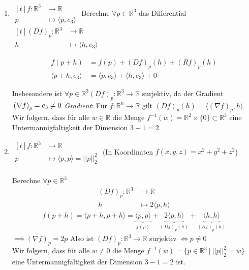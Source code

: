 \documentclass[../main.tex]{subfiles}
\begin{document}
\begin{examples}
\leavevmode
\begin{enumerate}
    \item $\begin{aligned}[t]
        f \colon  \mathbb{R}^3 & \to \mathbb{R} \\
        p  & \mapsto \langle p, e_3 \rangle
    \end{aligned}$
    Berechne $\forall p \in \mathbb{R}^3$ das Differential
    $\begin{aligned}[t]\left(Df\right)_p \colon \mathbb{R}^3 & \to \mathbb{R} \\
    h & \mapsto \langle h,e_3 \rangle
    \end{aligned}$
    
    \begin{recall}[Dreigliedentwicklung]
    \begin{align*}
    f(p+h) &= f(p) + \left(Df\right)_p(h) + \left(Rf\right)_p(h) \\
    \langle p+h, e_3 \rangle &= \langle p, e_3 \rangle + \langle h, e_3 \rangle + 0
    \end{align*}
    \end{recall}
    Insbesondere ist $\forall p\in \mathbb{R}^3 \left(Df\right)_p \colon \mathbb{R}^3 \to \mathbb{R}$ surjektiv, da der Gradient $\\ \left(\nabla f \right)_p = e_3 \not = 0$ \quad \emph{Gradient}: Für $f \colon \mathbb{R}^n \to \mathbb{R}$ gilt $\left(Df\right)_p(h) = \langle \left(\nabla f\right)_p, h \rangle$. \\
    Wir folgern, dass für alle $w \in \mathbb{R}$ die Menge $f^{-1}(w)=\mathbb{R}^2 \times \{0\} \subset \mathbb{R}^3$ eine Untermannigfaltigkeit der Dimension $3-1=2$
    
    \item $\begin{aligned}[t]
        f \colon  \mathbb{R}^3 & \to \mathbb{R} \\
        p  & \mapsto \langle p, p \rangle = ||p||^2 _2
    \end{aligned}$
    \quad (In Koordinaten $f(x,y,z)=x^2 + y^2 + z^2$) \\ \\ Berechne $\forall p \in \mathbb{R}^3$
    \begin{align*}
        \left(Df\right)_p \colon \mathbb{R}^3 & \to \mathbb{R} \\
        h & \mapsto 2\langle p, h \rangle
    \end{align*}
    \begin{align*}
        f(p+h) = \langle p+h, p+h \rangle = \underbrace{\langle p,p \rangle}_\textrm{$f(p)$} +
        \underbrace{2\langle p,h \rangle}_\textrm{$(Df)_p(h)$} +
        \underbrace{\langle h,h \rangle}_\textrm{$(Rf)_p(h)$}
    \end{align*}
    $\implies (\nabla f)_p = 2p$ \quad Also ist $(Df)_p \colon \mathbb{R}^3 \to \mathbb{R}$ surjektiv $\iff p \not =0$\\
    Wir folgern, dass für alle $w \not = 0$ die Menge $f^{-1}(w) = \{p \in \mathbb{R}^3 \ \vert \ ||p||^2 _2 = w \}$ eine Untermannigfaltigkeit der Dimension $3-1 = 2$ ist.\\
    

\end{enumerate}
\end{examples}
\end{document}
